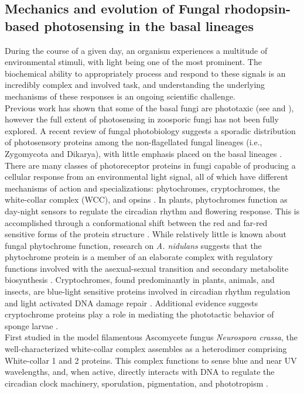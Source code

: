 \subsection*{Mechanics and evolution of Fungal rhodopsin-based photosensing in the basal lineages}
\indent During the course of a given day, an organism experiences a
multitude of environmental stimuli, with light being one of the most
prominent. The biochemical ability to appropriately process and
respond to these signals is an incredibly complex and involved task,
and understanding the underlying mechanisms of these responses is an
ongoing scientific challenge. \\
\indent Previous work has shown that some of the basal fungi are
phototaxic (see \cite{Saranak1997} and \cite{Muehlstein1987}), however
the full extent of photosensing in zoosporic fungi has not been fully
explored. A recent review of fungal photobiology suggests a sporadic
distribution of photosensory proteins among the non-flagellated fungal
lineages (i.e., Zygomycota and Dikarya), with little emphasis placed on
the basal lineages \cite{Idnurm2010}. There are many classes of
photoreceptor proteins in fungi capable of producing a cellular
response from an environmental light signal, all of which have
different mechanisms of action and specializations: phytochromes,
cryptochromes, the white-collar complex (WCC), and opsins
\cite{Idnurm2010}. In plants, phytochromes function as day-night
sensors to regulate the circadian rhythm and flowering response. This
is accomplished through a conformational shift between the red and
far-red sensitive forms of the protein structure
\cite{Rockwell2006}. While relatively little is known about fungal
phytochrome function, research on \textit{A. nidulans} suggests that
the phytochrome protein is a member of an elaborate complex with
regulatory functions involved with the asexual-sexual transition and
secondary metabolite biosynthesis \cite{Idnurm2010}. Cryptochromes,
found predominantly in plants, animals, and insects, are blue-light
sensitive proteins involved in circadian rhythm regulation and light
activated DNA damage repair \cite{Idnurm2010}. Additional evidence
suggests cryptochrome proteins play a role in mediating the
phototactic behavior of sponge larvae \cite{Rivera2012}.\\
\indent First studied in the model filamentous Ascomycete fungus \textit{Neurospora crassa}, the well-characterized white-collar complex assembles as a heterodimer comprising White-collar 1 and 2 proteins. This complex functions to sense blue and near UV wavelengths, and, when active, directly interacts with DNA to regulate the circadian clock machinery, sporulation, pigmentation, and phototropism \cite{Ballario1997,Purschwitz2006,Corrochano2007}. \\
